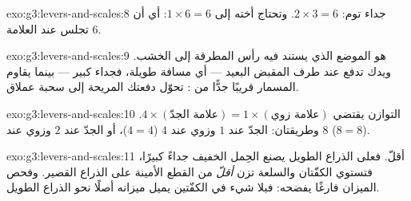 \begin{solution}{exo:g3:levers-and-scales:8}
جداء توم: $2 \times 3 = 6$. وتحتاج أخته إلى $1 \times 6 = 6$:
أي أن تجلس عند العلامة $6$.
\end{solution}

\begin{solution}{exo:g3:levers-and-scales:9}
 هو الموضع الذي يستند فيه رأس المطرقة إلى الخشب.
ويدك تدفع عند طرف المقبض البعيد --- أي مسافة طويلة، فجداء كبير
--- بينما يقاوم المسمار قريبًا جدًّا من : 
تحوّل دفعتك المريحة إلى سحبة عملاق.
\end{solution}

\begin{solution}{exo:g3:levers-and-scales:10}
التوازن يقتضي $4 \times (\text{علامة الجدّ}) = 1 \times
(\text{علامة زوي})$. وطريقتان: الجدّ عند $1$ وزوي عند $4$
($4 = 4$)، أو الجدّ عند $2$ وزوي عند $8$ ($8 = 8$).
\end{solution}

\begin{solution}{exo:g3:levers-and-scales:11}
أقلّ. فعلى الذراع الطويل يصنع الحِمل الخفيف جداءً كبيرًا، فتستوي
الكفّتان والسلعة تزن \emph{أقلّ} من القطع الأمينة على الذراع
القصير. وفحص الميزان فارغًا يفضحه: فبلا شيء في الكفّتين يميل
ميزانه أصلًا نحو الذراع الطويل.
\end{solution}
